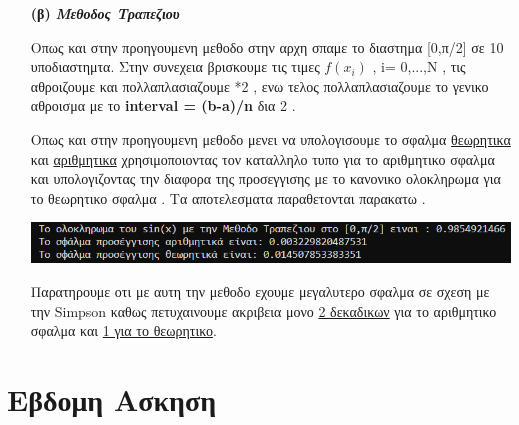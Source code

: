 \documentclass[a4paper,11pt]{article}
\begin{document}
\begin{enumerate}
		\item[\textbf{(β)}] \emph {\textbf{Μεθοδος Τραπεζιου}}
		\begin{center}
			Οπως και στην προηγουμενη μεθοδο στην αρχη σπαμε το διαστημα [0,π/2] σε 10 υποδιαστημτα. Στην συνεχεια βρισκουμε τις τιμες $f(x_i)$ , i= 0,...,N , τις αθροιζουμε και πολλαπλασιαζουμε *2 , ενω τελος πολλαπλασιαζουμε το γενικο αθροισμα με το \textbf{interval = (b-a)/n} δια 2 . 
		\end{center}
		\begin{center}
			Οπως και στην προηγουμενη μεθοδο μενει να υπολογισουμε το σφαλμα \underline{θεωρητικα} και \underline{αριθμητικα} χρησιμοποιοντας τον καταλληλο τυπο για το αριθμητικο σφαλμα και υπολογιζοντας την διαφορα της προσεγγισης με το κανονικο ολοκληρωμα για το θεωρητικο σφαλμα . Τα αποτελεσματα παραθετονται παρακατω .
		\end{center}
		\begin{center}
			\emph{\includegraphics[scale=0.55]{trapezium.png}}
		\end{center}
		\begin{center}
			Παρατηρουμε οτι με αυτη την μεθοδο εχουμε μεγαλυτερο σφαλμα σε σχεση με την Simpson καθως πετυχαινουμε ακριβεια μονο \underline{2 δεκαδικων} για το αριθμητικο σφαλμα και \underline{1 για το θεωρητικο}.
		\end{center}
	\end{enumerate}
	
	\section{Εβδομη Ασκηση}
	
\end{document}
